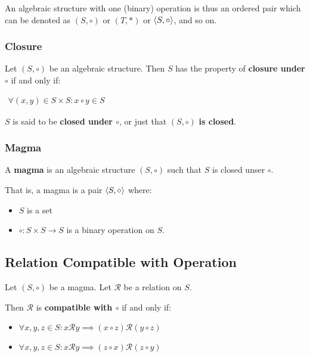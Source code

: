 An algebraic structure with one (binary) operation is thus an ordered
pair which can be denoted as $(S, \circ)$ or $(T, *)$ or
$\langle S, \circ \rangle$, and so on.


\subsubsection{Closure}
\label{sec:closure}

Let $(S, \circ)$ be an algebraic structure. Then $S$ has the property
of \textbf{closure under $\circ$} if and only if:

\begin{math}
  \begin{array}{c}
    \forall (x, y) \in S \times S : x \circ y \in S
  \end{array}
\end{math}


$S$ is said to be \textbf{closed under $\circ$}, or just that
$(S, \circ)$ \textbf{is closed}.

\subsubsection{Magma}
\label{sec:magma}

A \textbf{magma} is an algebraic structure $(S, \circ)$ such that $S$
is closed unser $\circ$.

That is, a magma is a pair $\langle S, \circ \rangle$ where:

\begin{itemize}
\item $S$ is a set
\item $\circ: S \times S \to S $ is a binary operation on $S$.
\end{itemize}


\subsection{Relation Compatible with Operation}
\label{sec:compatibility}

Let $(S, \circ)$ be a magma. Let $\mathcal{R}$ be a relation on $S$.

Then $\mathcal{R}$ is \textbf{compatible with $\circ$} if and only if:

\begin{itemize}
\item $\forall x, y, z \in S: x \mathcal{R} y \implies (x \circ z) \mathcal{R} (y \circ z)$
\item $\forall x, y, z \in S: x \mathcal{R} y \implies (z \circ x) \mathcal{R} (z \circ y)$
\end{itemize}


